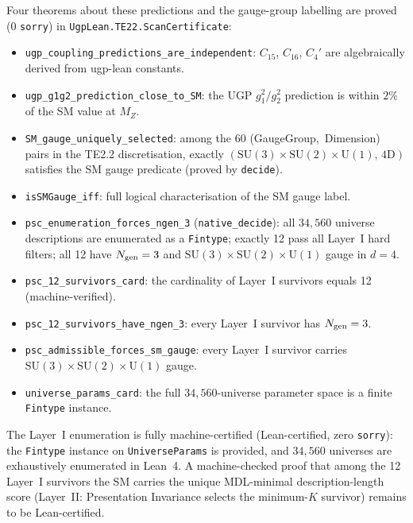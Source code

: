 \documentclass[11pt,twocolumn]{article}
\theoremstyle{remark}
\begin{document}
Four theorems about these predictions and the gauge-group labelling are
proved (0 \texttt{sorry}) in \texttt{UgpLean.TE22.ScanCertificate}:
\begin{itemize}
  \item \texttt{ugp\_coupling\_\allowbreak{}predictions\_\allowbreak{}are\_\allowbreak{}independent}: $C_{15}$,
    $C_{16}$, $C_4'$ are algebraically derived from ugp-lean constants.
  \item \texttt{ugp\_g1g2\_prediction\_close\_to\_SM}: the UGP
    $g_1^2/g_2^2$ prediction is within $2\%$ of the SM value at $M_Z$.
  \item \texttt{SM\_gauge\_uniquely\_selected}: among the
    $60$ \mbox{(GaugeGroup, Dimension)} pairs in the TE2.2 discretisation,
    exactly $(\mathrm{SU}(3){\times}\mathrm{SU}(2){\times}\mathrm{U}(1),\,4\mathrm{D})$
    satisfies the SM gauge predicate (proved by \texttt{decide}).
  \item \texttt{isSMGauge\_iff}: full logical characterisation
    of the SM gauge label.
  \item \texttt{psc\_enumeration\_forces\_ngen\_3} (\texttt{native\_decide}):
    all $34{,}560$ universe descriptions are enumerated as a \texttt{Fintype};
    exactly 12 pass all Layer~I hard filters; all 12 have $N_{\rm gen}=3$
    and $\mathrm{SU}(3){\times}\mathrm{SU}(2){\times}\mathrm{U}(1)$ gauge
    in $d=4$.
  \item \texttt{psc\_12\_survivors\_card}: the cardinality of
    Layer~I survivors equals 12 (machine-verified).
  \item \texttt{psc\_12\_survivors\_have\_ngen\_3}: every Layer~I survivor
    has $N_{\rm gen}=3$.
  \item \texttt{psc\_admissible\_forces\_sm\_gauge}: every Layer~I survivor
    carries $\mathrm{SU}(3){\times}\mathrm{SU}(2){\times}\mathrm{U}(1)$ gauge.
  \item \texttt{universe\_params\_card}: the full $34{,}560$-universe
    parameter space is a finite \texttt{Fintype} instance.
\end{itemize}
The Layer~I enumeration is fully machine-certified (Lean-certified, zero \texttt{sorry}):
the \texttt{Fintype} instance on \texttt{UniverseParams}
is provided, and $34{,}560$ universes are exhaustively enumerated in Lean~4.
A machine-checked proof that among the 12 Layer~I survivors the SM carries the
unique MDL-minimal description-length score (Layer~II: Presentation Invariance
selects the minimum-$K$ survivor) remains to be Lean-certified.
\end{document}
